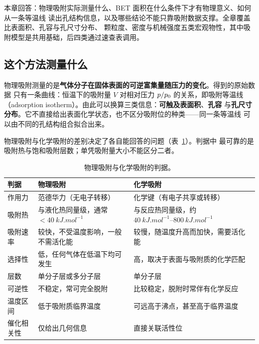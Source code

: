 
%
{本章回答：物理吸附实际测量什么、BET 面积在什么条件下才有物理意义、如何从一条等温线
读出孔结构信息，以及哪些结论不能只靠吸附数据支撑。全章覆盖比表面积、孔容与孔尺寸分布、
颗粒度、密度与机械强度五类宏观物性，其中吸附模型是共用基础，后四类通过速查表调用。}
\label{ch:01}

\subsection{这个方法测量什么}

\begin{probout}
物理吸附测量的是\textbf{气体分子在固体表面的可逆富集量随压力的变化}。得到的原始数据
只有一条曲线：恒温下的吸附量 $V$ 对相对压力 $p/p_{0}$ 的关系，即吸附等温线
（adsorption isotherm）。由此可以换算三类信息：\textbf{可触及表面积}、\textbf{孔容}
与\textbf{孔尺寸分布}。它不直接给出表面化学状态，也不区分吸附位的种类——同一条等温线
可以由不同的孔结构组合拟合出来。
\end{probout}

物理吸附与化学吸附的差别决定了各自能回答的问题（表~\ref{tab:physis-chemis}）。判据中
最可靠的是吸附热与饱和吸附层数；单凭吸附量大小不能区分二者。

\begin{table}[htbp]
\centering
\caption{物理吸附与化学吸附的判据。}
\label{tab:physis-chemis}
{\srcsize
\begin{tabularx}{\columnwidth}{@{}lXX@{}}
\toprule
判据 & 物理吸附 & 化学吸附 \\
\midrule
作用力 & 范德华力（无电子转移） & 化学键（有电子共享或转移） \\
吸附热 & 与液化热同量级，通常 $<\qty{40}{kJ.mol^{-1}}$ & 与反应热同量级，约 $\qtyrange{40}{800}{kJ.mol^{-1}}$ \\
吸附速率 & 较快，不受温度影响，一般不需活化能 & 较慢，随温度升高而加快，需要活化能 \\
选择性 & 低，任何气体在低温下均可发生 & 高，取决于表面与吸附质的化学匹配 \\
层数 & 单分子层或多分子层 & 单分子层 \\
可逆性 & 不稳定，常可完全脱附 & 比较稳定，脱附时常伴有化学反应 \\
温度区间 & 低于吸附质临界温度 & 可远高于沸点，甚至高于临界温度 \\
催化相关性 & 仅给出几何信息 & 直接关联活性位 \\
\bottomrule
\end{tabularx}}
\end{table}

